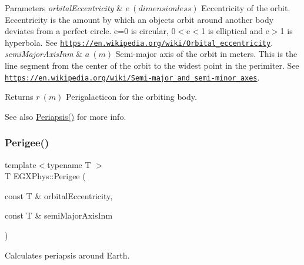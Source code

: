 \begin{DoxyParams}{Parameters}
{\em orbital\+Eccentricity} & $ e\ (dimensionless)$ Eccentricity of the orbit. Eccentricity is the amount by which an objects orbit around another body deviates from a perfect circle. e=0 is circular, 0$<$e$<$1 is elliptical and e$>$1 is hyperbola. See \href{https://en.wikipedia.org/wiki/Orbital_eccentricity}{\tt https\+://en.\+wikipedia.\+org/wiki/\+Orbital\+\_\+eccentricity}. \\
\hline
{\em semi\+Major\+Axis\+Inm} & $ a\ (m)$ Semi-\/major axis of the orbit in meters. This is the line segment from the center of the orbit to the widest point in the perimiter. See \href{https://en.wikipedia.org/wiki/Semi-major_and_semi-minor_axes}{\tt https\+://en.\+wikipedia.\+org/wiki/\+Semi-\/major\+\_\+and\+\_\+semi-\/minor\+\_\+axes}. \\
\hline
\end{DoxyParams}
\begin{DoxyReturn}{Returns}
$ r\ (m)$ Perigalacticon for the orbiting body. 
\end{DoxyReturn}
\begin{DoxySeeAlso}{See also}
\mbox{\hyperlink{group___e_g_x_phys-_periapsis_gad487212733711bc2ce73c8137c9309c3}{Periapsis()}} for more info. 
\end{DoxySeeAlso}
\mbox{\label{group___e_g_x_phys-_periapsis_gac6e1edb1916ff1a37f4bc0b01e6511d4}} 
\subsubsection{\texorpdfstring{Perigee()}{Perigee()}}
{\footnotesize\ttfamily template$<$typename T $>$ \\
T E\+G\+X\+Phys\+::\+Perigee (\begin{DoxyParamCaption}\item[{const T \&}]{orbital\+Eccentricity,  }\item[{const T \&}]{semi\+Major\+Axis\+Inm }\end{DoxyParamCaption})}



Calculates periapsis around Earth. 


